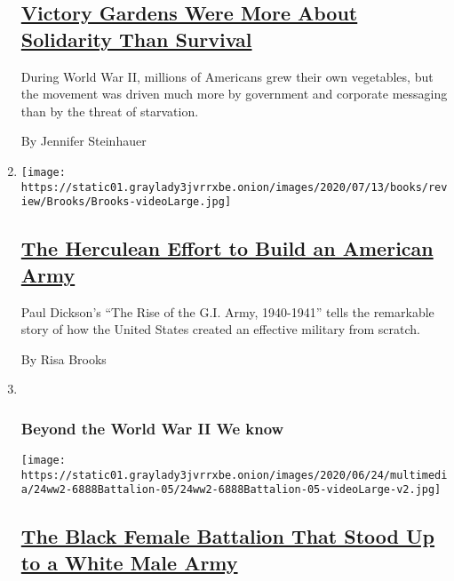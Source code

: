 \begin{enumerate}
{  \subsection{\texorpdfstring{\href{/2020/07/15/magazine/victory-gardens-world-war-II.html}{Victory
  Gardens Were More About Solidarity Than
  Survival}}{Victory Gardens Were More About Solidarity Than Survival}}\label{victory-gardens-were-more-about-solidarity-than-survival}}

  During World War II, millions of Americans grew their own vegetables,
  but the movement was driven much more by government and corporate
  messaging than by the threat of starvation.

  By Jennifer Steinhauer
\item
  \texttt{[image: https://static01.graylady3jvrrxbe.onion/images/2020/07/13/books/review/Brooks/Brooks-videoLarge.jpg]}

  \hypertarget{the-herculean-effort-to-build-an-american-army}{%
  \subsection{\texorpdfstring{\href{/2020/07/15/books/review/the-rise-of-the-gi-army-paul-dickson.html}{The
  Herculean Effort to Build an American
  Army}}{The Herculean Effort to Build an American Army}}\label{the-herculean-effort-to-build-an-american-army}}

  Paul Dickson's ``The Rise of the G.I. Army, 1940-1941'' tells the
  remarkable story of how the United States created an effective
  military from scratch.

  By Risa Brooks
\item ~
  \hypertarget{beyond-the-world-war-ii-we-know-5}{%
  \subsubsection{Beyond the World War II We
  know}\label{beyond-the-world-war-ii-we-know-5}}

  \texttt{[image: https://static01.graylady3jvrrxbe.onion/images/2020/06/24/multimedia/24ww2-6888Battalion-05/24ww2-6888Battalion-05-videoLarge-v2.jpg]}

  \hypertarget{the-black-female-battalion-that-stood-up-to-a-white-male-army}{%
  \subsection{\texorpdfstring{\href{/2020/06/17/magazine/6888th-battalion-charity-adams.html}{The
  Black Female Battalion That Stood Up to a White Male
  Army}}{The Black Female Battalion That Stood Up to a White Male Army}}\label{the-black-female-battalion-that-stood-up-to-a-white-male-army}}


\end{enumerate}
